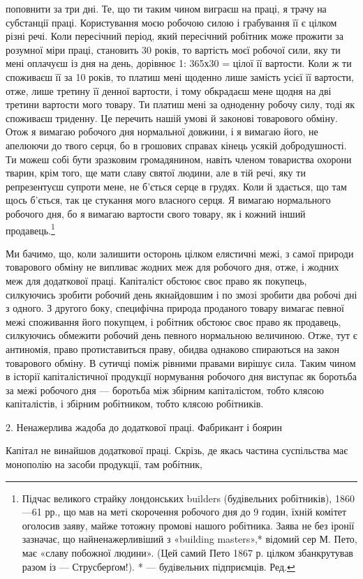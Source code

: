 поповнити за три дні. Те, що ти таким чином виграєш на праці,
я трачу на субстанції праці. Користування моєю робочою силою
і грабування її є цілком різні речі. Коли пересічний період,
який пересічний робітник може прожити за розумної міри праці,
становить 30 років, то вартість моєї робочої сили, яку ти мені
оплачуєш із дня на день, дорівнює 1: 365х30 =   цілої її
вартости. Коли ж ти споживаєш її за 10 років, то платиш мені
щоденно лише  замість  усієї її вартости, отже, лише
третину її денної вартости, і тому обкрадаєш мене щодня на дві
третини вартости мого товару. Ти платиш мені за одноденну
робочу силу, тоді як споживаєш триденну. Це перечить нашій
умові й законові товарового обміну. Отож я вимагаю робочого
дня нормальної довжини, і я вимагаю його, не апелюючи до твого
серця, бо в грошових справах кінець усякій добродушності.
Ти можеш собі бути зразковим громадянином, навіть членом
товариства охорони тварин, крім того, ще мати славу святої
людини, але в тій речі, яку ти репрезентуєш супроти мене, не
б’ється серце в грудях. Коли й здається, що там щось б’ється,
так це стукання мого власного серця. Я вимагаю нормального
робочого дня, бо я вимагаю вартости свого товару, як і кожний
інший продавець.\footnote{
Підчас великого страйку лондонських builders (будівельних робітників),
1860—61 рр., що мав на меті скорочення робочого дня до 9 годин,
їхній комітет оголосив заяву, майже тотожну промові нашого робітника.
Заява не без іронії зазначає, що найненажерливіший з «building
masters»,* відомий сер М. Пето, має «славу побожної людини». (Цей
самий Пето 1867 р. цілком збанкрутував разом із — Струсберґом!).
* — будівельних підприємців. Ред.
}

Ми бачимо, що, коли залишити осторонь цілком елястичні
межі, з самої природи товарового обміну не випливає жодних
меж для робочого дня, отже, і жодних меж для додаткової праці.
Капіталіст обстоює своє право як покупець, силкуючись зробити
робочий день якнайдовшим і по змозі зробити два робочі дні з
одного. З другого боку, специфічна природа проданого товару
вимагає певної межі споживання його покупцем, і робітник обстоює
своє право як продавець, силкуючись обмежити робочий день
певного нормальною величиною. Отже, тут є антиномія, право
протиставиться праву, обидва однаково спираються на закон
товарового обміну. В сутичці поміж рівними правами вирішує
сила. Таким чином в історії капіталістичної продукції нормування
робочого дня виступає як боротьба за межі робочого дня —
боротьба між збірним капіталістом, тобто клясою капіталістів,
і збірним робітником, тобто клясою робітників.

2. Ненажерлива жадоба до додаткової праці. Фабрикант і боярин

Капітал не винайшов додаткової праці. Скрізь, де якась частина
суспільства має монополію на засоби продукції, там робітник,